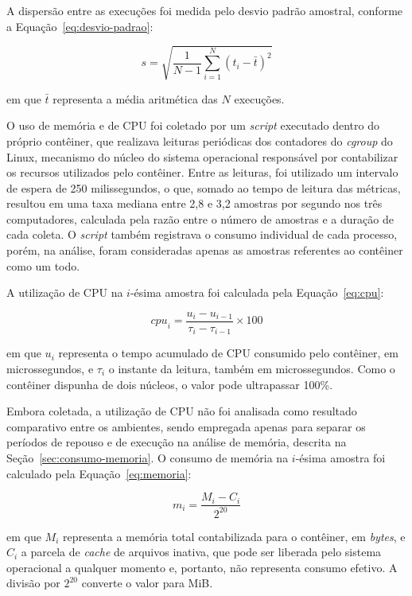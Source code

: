 A dispersão entre as execuções foi medida pelo desvio padrão amostral, conforme a Equação~\eqref{eq:desvio-padrao}:

\begin{equation}
\label{eq:desvio-padrao}
s = \sqrt{\frac{1}{N-1} \sum_{i=1}^{N} \left( t_i - \bar{t} \right)^2}
\end{equation}

\noindent em que $\bar{t}$ representa a média aritmética das $N$ execuções.

O uso de memória e de CPU foi coletado por um \emph{script} executado dentro do próprio contêiner, que realizava leituras periódicas dos contadores do \emph{cgroup} do Linux, mecanismo do núcleo do sistema operacional responsável por contabilizar os recursos utilizados pelo contêiner. Entre as leituras, foi utilizado um intervalo de espera de 250 milissegundos, o que, somado ao tempo de leitura das métricas, resultou em uma taxa mediana entre 2,8 e 3,2 amostras por segundo nos três computadores, calculada pela razão entre o número de amostras e a duração de cada coleta. O \emph{script} também registrava o consumo individual de cada processo, porém, na análise, foram consideradas apenas as amostras referentes ao contêiner como um todo.

A utilização de CPU na $i$-ésima amostra foi calculada pela Equação~\eqref{eq:cpu}:

\begin{equation}
\label{eq:cpu}
\mathit{cpu}_i = \frac{u_i - u_{i-1}}{\tau_i - \tau_{i-1}} \times 100
\end{equation}

\noindent em que $u_i$ representa o tempo acumulado de CPU consumido pelo contêiner, em microssegundos, e $\tau_i$ o instante da leitura, também em microssegundos. Como o contêiner dispunha de dois núcleos, o valor pode ultrapassar 100\%.

Embora coletada, a utilização de CPU não foi analisada como resultado comparativo entre os ambientes, sendo empregada apenas para separar os períodos de repouso e de execução na análise de memória, descrita na Seção~\ref{sec:consumo-memoria}. O consumo de memória na $i$-ésima amostra foi calculado pela Equação~\eqref{eq:memoria}:

\begin{equation}
\label{eq:memoria}
m_i = \frac{M_i - C_i}{2^{20}}
\end{equation}

\noindent em que $M_i$ representa a memória total contabilizada para o contêiner, em \emph{bytes}, e $C_i$ a parcela de \emph{cache} de arquivos inativa, que pode ser liberada pelo sistema operacional a qualquer momento e, portanto, não representa consumo efetivo. A divisão por $2^{20}$ converte o valor para MiB.

